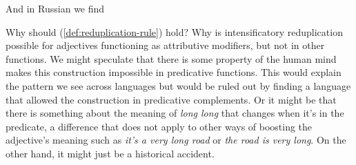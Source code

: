 \ea
   \z
\z


And in Russian we find
\ea
    \z
\z





Why should (\ref{def:reduplication-rule}) hold? Why is intensificatory reduplication possible for adjectives functioning as attributive modifiers, but not in other functions. We might speculate that there is some property of the human mind makes this construction impossible in predicative functions. This would explain the pattern we see across languages but would be ruled out by finding a language that allowed the construction in predicative complements. Or it might be that there is something about the meaning of \textit{long long} that changes when it's in the predicate, a difference that does not apply to other ways of boosting the adjective's meaning such as \textit{it's a very long road} or \textit{the road is very long}. On the other hand, it might just be a historical accident.



